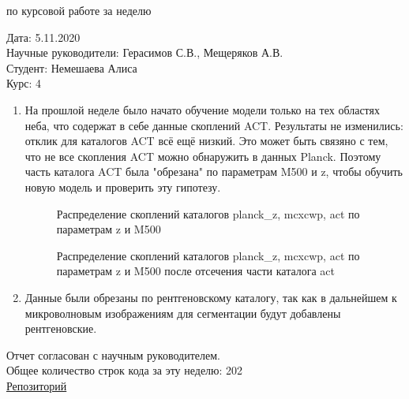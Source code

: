 \documentclass{article}
\begin{document}
\begin{center}{ по курсовой работе за неделю\\}\end{center}
Дата: 5.11.2020\\
Научные руководители: Герасимов С.В., Мещеряков А.В.\\
Студент: Немешаева Алиса\\
Курс: 4\\

\renewcommand{\labelitemi}{$\blacksquare$}
\renewcommand\labelitemii{$\square$}
\begin{enumerate}
    \item На прошлой неделе было начато обучение модели только на тех областях неба, что содержат 
        в себе данные скоплений ACT. Результаты не изменились: отклик для каталогов ACT всё ещё 
        низкий. Это может быть связяно с тем, что не все скопления ACT можно обнаружить в данных 
        Planck. Поэтому часть каталога ACT была "обрезана" по параметрам M500 и z, чтобы обучить 
        новую модель и проверить эту гипотезу.\\
    \begin{figure}[h]
        \caption{Распределение скоплений каталогов planck\_z, mcxcwp, act по параметрам z и M500}
    \end{figure}
    \begin{figure}[h]
        \caption{Распределение скоплений каталогов planck\_z, mcxcwp, act по параметрам z и M500
            после отсечения части каталога act}
    \end{figure}

     \item Данные были обрезаны по рентгеновскому каталогу, так как в дальнейшем к микроволновым 
         изображениям для сегментации будут добавлены рентгеновские.\\

\end{enumerate}

Отчет согласован с научным руководителем.\\
Общее количество строк кода за эту неделю: 202\\
\hyperlink{https://github.com/rt2122/data-segmentation-2}{Репозиторий}\\ 
\end{document}
